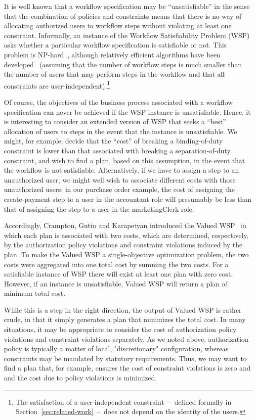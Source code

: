 \documentclass[jcs,crcready]{iosart1c}
\begin{document}
It is well known that a workflow specification may be ``unsatisfiable'' in the sense that the combination of policies and constraints means that there is no way of allocating authorized users to workflow steps without violating at least one constraint. Informally, an instance of the Workflow Satisfiability Problem (WSP) asks whether a particular workflow specification is satisfiable or not. 
This problem is NP-hard~\cite{WaLi10}, although relatively efficient algorithms have been developed~\cite{CoCrGaGuJo14,CrGuYe13,KaGaGu,WaLi10} (assuming that the number of workflow steps is much smaller than the number of users that may perform steps in the workflow and that all constraints are user-independent).\footnote{The satisfaction of a user-independent constraint~--~defined formally in Section~\ref{sec:related-work}~--~does not depend on the identity of the users.}

Of course, the objectives of the business process associated with a workflow specification can never be achieved if the WSP instance is unsatisfiable.
Hence, it is interesting to consider an extended version of WSP that seeks a ``best'' allocation of users to steps in the event that the instance is unsatisfiable.
We might, for example, decide that the ``cost'' of breaking a binding-of-duty constraint is lower than that associated with breaking a separation-of-duty constraint, and wish to find a plan, based on this assumption, in the event that the workflow is not satisfiable.
Alternatively, if we have to assign a step to an unauthorized user, we might well wish to associate different costs with those unauthorized users: in our purchase order example, the cost of assigning the create-payment step to a user in the \textsf{accountant} role will presumably be less than that of assigning the step to a user in the \textsf{marketingClerk} role.

Accordingly, Crampton, Gutin and Karapetyan introduced the Valued WSP~\cite{CrGuKa15} in which each plan is associated with two costs, which are determined, respectively, by the authorization policy violations and constraint violations induced by the plan. 
To make the Valued WSP a single-objective optimization problem, the two costs were aggregated into one total cost by summing the two costs. 
For a satisfiable instance of WSP there will exist at least one plan with zero cost.
However, if an instance is unsatisfiable, Valued WSP will return a plan of minimum total cost.

While this is a step in the right direction, the output of Valued WSP is rather crude, in that it simply generates a plan that minimizes the total cost.
In many situations, it may be appropriate to consider the cost of authorization policy violations and constraint violations separately.
As we noted above, authorization policy is typically a matter of local, "discretionary" configuration, whereas constraints may be mandated by statutory requirements.
Thus, we may want to find a plan that, for example, ensures the cost of constraint violations is zero and and the cost due to policy violations is minimized.
\end{document}
